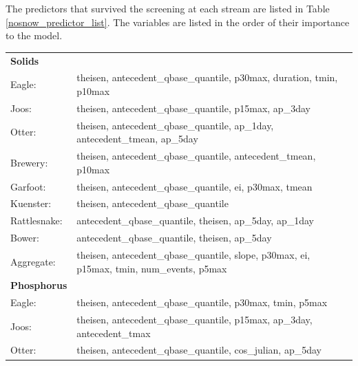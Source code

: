 \documentclass[10pt]{article}
\begin{document}
The predictors that survived the screening at each stream are listed in Table \ref{nosnow_predictor_list}. The variables are listed in the order of their importance to the model.\\

\begin{table}[h!]\small
    \begin{center}
    \begin{tabular}{ll}
        \textbf{Solids} & \\
        \hspace{5mm} Eagle: & theisen, antecedent\_qbase\_quantile, p30max, duration, tmin, p10max\\
        \hspace{5mm} Joos: & theisen, antecedent\_qbase\_quantile, p15max, ap\_3day\\
        \hspace{5mm} Otter: & theisen, antecedent\_qbase\_quantile, ap\_1day, antecedent\_tmean, ap\_5day\\
        \hspace{5mm} Brewery: & theisen, antecedent\_qbase\_quantile, antecedent\_tmean, p10max\\
        \hspace{5mm} Garfoot: & theisen, antecedent\_qbase\_quantile, ei, p30max, tmean\\
        \hspace{5mm} Kuenster: & theisen, antecedent\_qbase\_quantile\\
        \hspace{5mm} Rattlesnake: & antecedent\_qbase\_quantile, theisen, ap\_5day, ap\_1day \\
        \hspace{5mm} Bower: & antecedent\_qbase\_quantile, theisen, ap\_5day\\
        \hspace{5mm} Aggregate: & theisen, antecedent\_qbase\_quantile, slope, p30max, ei, p15max, tmin, num\_events, p5max
    \vspace{2mm}\\
        \textbf{Phosphorus} & \\
        \hspace{5mm} Eagle: & theisen, antecedent\_qbase\_quantile, p30max, tmin, p5max\\
        \hspace{5mm} Joos: & theisen, antecedent\_qbase\_quantile, p15max, ap\_3day, antecedent\_tmax\\
        \hspace{5mm} Otter: & theisen, antecedent\_qbase\_quantile, cos\_julian, ap\_5day\\

\end{tabular}
\end{center}
\end{table}
\end{document}
